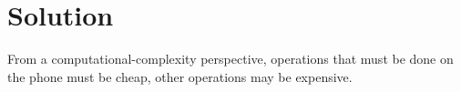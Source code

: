 \mode*

\section{Solution}

From a computational-complexity perspective, operations that must be done on 
the phone must be cheap, other operations may be expensive.


